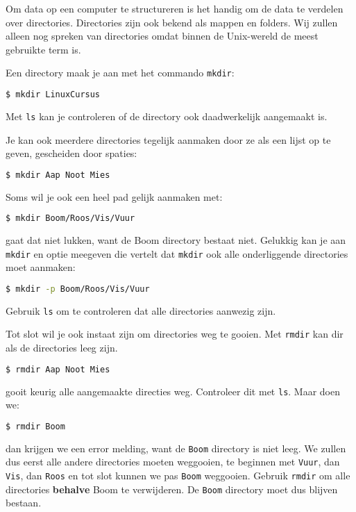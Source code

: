 Om data op een computer te structureren is het handig om de data te verdelen over directories. Directories zijn ook bekend als mappen en folders. Wij zullen alleen nog spreken van directories omdat binnen de Unix-wereld de meest gebruikte term is.

Een directory maak je aan met het commando \texttt{mkdir}:
\begin{lstlisting}[language=bash]
$ mkdir LinuxCursus
\end{lstlisting}
Met \texttt{ls} kan je controleren of de directory ook daadwerkelijk aangemaakt is.

Je kan ook meerdere directories tegelijk aanmaken door ze als een lijst op te geven, gescheiden door spaties:
\begin{lstlisting}[language=bash]
$ mkdir Aap Noot Mies
\end{lstlisting}

Soms wil je ook een heel pad gelijk aanmaken met:
\begin{lstlisting}[language=bash]
$ mkdir Boom/Roos/Vis/Vuur
\end{lstlisting}
gaat dat niet lukken, want de Boom directory bestaat niet. Gelukkig kan je aan \texttt{mkdir} en optie meegeven die vertelt dat \texttt{mkdir} ook alle onderliggende directories moet aanmaken:
\begin{lstlisting}[language=bash]
$ mkdir -p Boom/Roos/Vis/Vuur
\end{lstlisting}
Gebruik \texttt{ls} om te controleren dat alle directories aanwezig zijn.

Tot slot wil je ook instaat zijn om directories weg te gooien. Met \texttt{rmdir} kan dir als de directories leeg zijn.
\begin{lstlisting}[language=bash]
$ rmdir Aap Noot Mies
\end{lstlisting}
gooit keurig alle aangemaakte directies weg. Controleer dit met \texttt{ls}. Maar doen we:
\begin{lstlisting}[language=bash]
$ rmdir Boom
\end{lstlisting}
dan krijgen we een error melding, want de \texttt{Boom} directory is niet leeg. We zullen dus eerst alle andere directories moeten weggooien, te beginnen met \texttt{Vuur}, dan \texttt{Vis}, dan \texttt{Roos} en tot slot kunnen we pas \texttt{Boom} weggooien. Gebruik \texttt{rmdir} om alle directories \textbf{behalve} Boom te verwijderen. De \texttt{Boom} directory moet dus blijven bestaan. 
